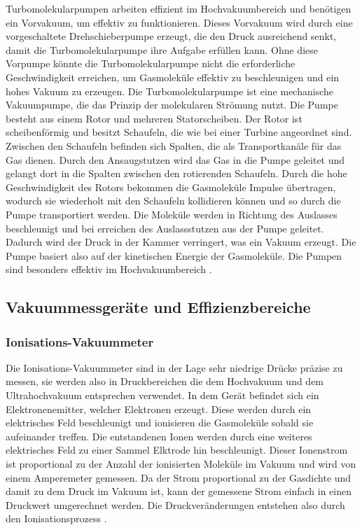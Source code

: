 Turbomolekularpumpen arbeiten effizient im Hochvakuumbereich und benötigen ein Vorvakuum, um effektiv zu funktionieren.
Dieses Vorvakuum wird durch eine vorgeschaltete Drehschieberpumpe erzeugt, die den Druck ausreichend senkt,
damit die Turbomolekularpumpe ihre Aufgabe erfüllen kann. Ohne diese Vorpumpe könnte die Turbomolekularpumpe nicht die erforderliche Geschwindigkeit erreichen,
um Gasmoleküle effektiv zu beschleunigen und ein hohes Vakuum zu erzeugen.
Die Turbomolekularpumpe ist eine mechanische Vakuumpumpe, die das Prinzip der molekularen Strömung nutzt.
Die Pumpe besteht aus einem Rotor und mehreren Statorscheiben. Der Rotor ist scheibenförmig und besitzt Schaufeln, die wie bei einer Turbine angeordnet sind.
Zwischen den Schaufeln befinden sich Spalten, die als Transportkanäle für das Gas dienen.
Durch den Ansaugstutzen wird das Gas in die Pumpe geleitet und gelangt dort in die Spalten zwischen den rotierenden Schaufeln. Durch die
hohe Geschwindigkeit des Rotors bekommen die Gasmoleküle Impulse übertragen, wodurch sie wiederholt mit den Schaufeln kollidieren können und so durch
die Pumpe transportiert werden. Die Moleküle werden in Richtung des Auslasses beschleunigt und bei erreichen des Auslassstutzen aus der Pumpe geleitet.
Dadurch wird der Druck in der Kammer verringert, was ein Vakuum erzeugt.
Die Pumpe basiert also auf der kinetischen Energie der Gasmoleküle. Die Pumpen sind besonders effektiv im Hochvakuumbereich
\cite{turbomolekularpumpe}.

\subsection{Vakuummessgeräte und Effizienzbereiche}
\subsubsection{Ionisations-Vakuummeter}
Die Ionisations-Vakuummeter sind in der Lage sehr niedrige Drücke präzise zu messen, sie werden also in Druckbereichen die dem Hochvakuum 
und dem Ultrahochvakuum entsprechen verwendet. In dem Gerät befindet sich ein Elektronenemitter, welcher Elektronen erzeugt. Diese
werden durch ein elektrisches Feld beschleunigt und ionisieren die Gasmoleküle sobald sie aufeinander treffen. Die entstandenen Ionen werden durch eine 
weiteres elektrisches Feld zu einer Sammel Elktrode hin beschleunigt. Dieser Ionenstrom ist proportional zu der Anzahl der ionisierten Moleküle im Vakuum und 
wird von einem Amperemeter gemessen. Da der Strom proportional zu der Gasdichte und damit zu dem Druck im Vakuum ist, kann der gemessene Strom einfach in einen 
Druckwert umgerechnet werden. Die Druckveränderungen entstehen also durch den Ionisationsprozess \cite{grundlagen_vakuumtechnik}.


